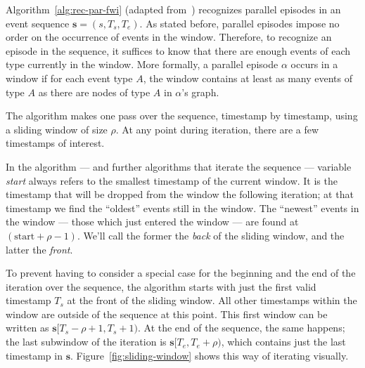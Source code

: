 Algorithm~\ref{alg:rec-par-fwi} (adapted from~\citep{mannila1997discovery}) recognizes parallel episodes in an event sequence $ \boldsymbol{s} = (s, T_s, T_e) $. As stated before, parallel episodes impose no order on the occurrence of events in the window. Therefore, to recognize an episode in the sequence, it suffices to know that there are enough events of each type currently in the window. More formally, a parallel episode $ \alpha $ occurs in a window if for each event type $ A $, the window contains at least as many events of type $ A $ as there are nodes of type $ A $ in $ \alpha $'s graph.

The algorithm makes one pass over the sequence, timestamp by timestamp, using a sliding window of size $ \rho $. At any point during iteration, there are a few timestamps of interest.

In the algorithm --- and further algorithms that iterate the sequence --- variable \emph{start} always refers to the smallest timestamp of the current window. It is the timestamp that will be dropped from the window the following iteration; at that timestamp we find the ``oldest'' events still in the window. The ``newest'' events in the window --- those which just entered the window --- are found at $ (\text{start} + \rho - 1) $. We'll call the former the \emph{back} of the sliding window, and the latter the \emph{front}.

To prevent having to consider a special case for the beginning and the end of the iteration over the sequence, the algorithm starts with just the first valid timestamp $ T_s $ at the front of the sliding window. All other timestamps within the window are outside of the sequence at this point. This first window can be written as $ \boldsymbol{s}[T_s - \rho + 1, T_s + 1) $. At the end of the sequence, the same happens; the last subwindow of the iteration is $ \boldsymbol{s}[T_e, T_e + \rho) $, which contains just the last timestamp in $ \boldsymbol{s} $. Figure~\ref{fig:sliding-window} shows this way of iterating visually.

